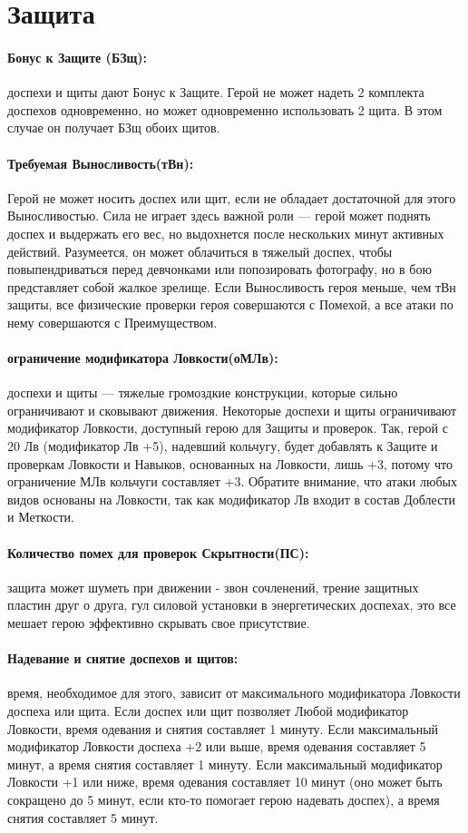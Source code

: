 \section{Защита}
\paragraph{Бонус к Защите (БЗщ):} доспехи и щиты дают Бонус к Защите. Герой не может надеть 2 комплекта доспехов одновременно, но может одновременно использовать 2 щита. В этом случае он получает БЗщ обоих щитов.
\paragraph{Требуемая Выносливость(тВн):} Герой не может носить доспех или щит, если не обладает достаточной для этого Выносливостью. Сила не играет здесь важной роли — герой может поднять доспех и выдержать его вес, но выдохнется после нескольких минут активных действий. Разумеется, он может облачиться в тяжелый доспех, чтобы повыпендриваться перед девчонками или попозировать фотографу, но в бою представляет собой жалкое зрелище.
\newline
Если Выносливость героя меньше, чем тВн защиты, все физические проверки героя совершаются с Помехой, а все атаки по нему совершаются с Преимуществом.
\paragraph{ограничение модификатора Ловкости(оМЛв):} доспехи и щиты — тяжелые громоздкие конструкции, которые сильно ограничивают и сковывают движения. Некоторые доспехи и щиты ограничивают модификатор Ловкости, доступный герою для Защиты и проверок. Так, герой с 20 Лв (модификатор Лв +5), надевший кольчугу, будет добавлять к Защите и проверкам Ловкости и Навыков, основанных на Ловкости, лишь +3, потому что ограничение МЛв кольчуги составляет +3. Обратите внимание, что атаки любых видов основаны на Ловкости, так как модификатор Лв входит в состав Доблести и Меткости.
\paragraph{Количество помех для проверок Скрытности(ПС):} защита может шуметь при движении - звон сочленений, трение защитных пластин друг о друга, гул силовой установки в энергетических доспехах, это все мешает герою эффективно скрывать свое присутствие.
\paragraph{Надевание и снятие доспехов и щитов:} время, необходимое для этого, зависит от максимального модификатора Ловкости доспеха или щита. Если доспех или щит позволяет Любой модификатор Ловкости, время одевания и снятия составляет 1 минуту. Если максимальный модификатор Ловкости доспеха +2 или выше, время одевания составляет 5 минут, а время снятия составляет 1 минуту.
\newline
Если максимальный модификатор Ловкости +1 или ниже, время одевания составляет 10 минут (оно может быть сокращено до 5 минут, если кто-то помогает герою надевать доспех), а время снятия составляет 5 минут.
